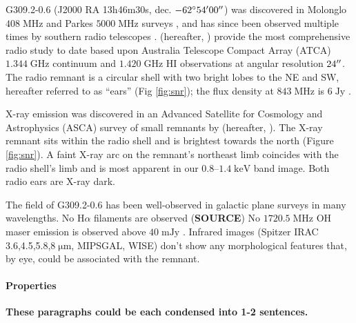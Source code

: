 \documentclass[preprint2,tighten,trackchanges]{aastex6}
\newcommand*{\mt}{\mathrm}
\newcommand*{\unit}[1]{\;\mt{#1}}  %
\begin{document}
G309.2-0.6 (J2000 RA 13h46m30s, dec. $-62\mbox{$^\circ$} 54\mbox{$^\prime$} 00\mbox{$^{\prime\prime}$}$) was
discovered in Molonglo $408 \unit{MHz}$ and Parkes $5000 \unit{MHz}$ surveys
\citep{day1969, clark1973, green1974, clark1975}, and has since been observed multiple
times by southern radio telescopes \citep{caswell1981, kesteven1987,
whiteoak1996, gaensler1998}.
\citet{gaensler1998} (hereafter, ) provide the most
comprehensive radio study to date based upon Australia Telescope Compact Array
(ATCA) $1.344 \unit{GHz}$ continuum and $1.420 \unit{GHz}$ HI observations at
angular resolution $24\mbox{$^{\prime\prime}$}$.
The radio remnant is a circular shell with two bright lobes to the NE and SW,
hereafter referred to as ``ears'' (Fig \ref{fig:snr});
the flux density at $843 \unit{MHz}$ is $6 \unit{Jy}$ \citep{whiteoak1996}.

X-ray emission was discovered in an Advanced Satellite for Cosmology and
Astrophysics (ASCA) survey of small remnants by \citet{rakowski2001}
(hereafter, ).
The X-ray remnant sits within the radio shell and is brightest towards the
north (Figure \ref{fig:snr}).
A faint X-ray arc on the remnant's northeast limb coincides with the radio
shell's limb and is most apparent in our $0.8$--$1.4 \unit{keV}$ band image.
Both radio ears are X-ray dark.

The field of G309.2-0.6 has been well-observed in galactic plane surveys in
many wavelengths.
No H$\alpha$ filaments are observed (\textbf{SOURCE}) %
No $1720.5 \unit{MHz}$ OH maser emission is observed above $40 \unit{mJy}$
\citep{green1997}.
Infrared images (Spitzer IRAC 3.6,4.5,5.8,$8 \unit{{\mu}m}$, MIPSGAL, WISE)
don't show any morphological features that, by eye, could be associated with
the remnant.

\paragraph{Properties}

\textbf{These paragraphs could be each condensed into 1-2 sentences.}
\end{document}
